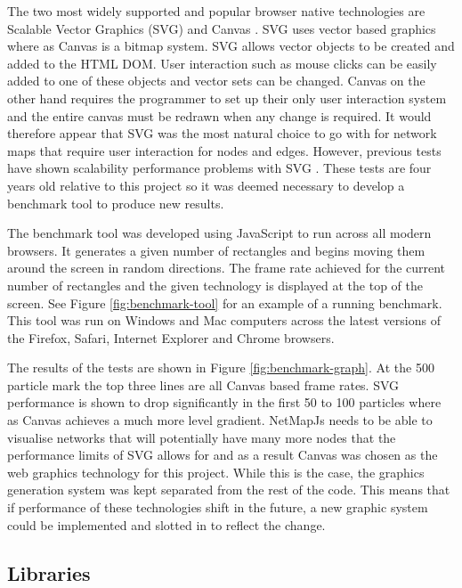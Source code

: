 \documentclass[11pt, a4paper]{article}
\begin{document}
The two most widely supported and popular browser native technologies are
Scalable Vector Graphics (SVG) \cite{Ferraiolo_2003} and Canvas
\cite{Canvas_website}. SVG uses vector based graphics where as Canvas is a
bitmap system. SVG allows vector objects to be created and added to the HTML
DOM. User interaction such as mouse clicks can be easily added to one of these
objects and vector sets can be changed. Canvas on the other hand requires the
programmer to set up their only user interaction system and the entire canvas
must be redrawn when any change is required. It would therefore appear that
SVG was the most natural choice to go with for network maps that require user
interaction for nodes and edges.  However, previous tests have shown scalability
performance problems with SVG \cite{Johnson_2008}. These tests are four years
old relative to this project so it was deemed necessary to develop a benchmark
tool to produce new results.

The benchmark tool was developed using JavaScript to run across all modern
browsers. It generates a given number of rectangles and begins moving them
around the screen in random directions. The frame rate achieved for the current
number of rectangles and the given technology is displayed at the top of the
screen. See Figure \ref{fig:benchmark-tool} for an example of a running
benchmark. This tool was run on Windows and Mac computers across the latest
versions of the Firefox, Safari, Internet Explorer and Chrome browsers. 

The results of the tests are shown in Figure \ref{fig:benchmark-graph}. At the
500 particle mark the top three lines are all Canvas based frame rates. SVG
performance is shown to drop significantly in the first 50 to 100 particles
where as Canvas achieves a much more level gradient. NetMapJs needs to be able
to visualise networks that will potentially have many more nodes that the
performance limits of SVG allows for and as a result Canvas was chosen as the
web graphics technology for this project. While this is the case, the graphics
generation system was kept separated from the rest of the code. This means that
if performance of these technologies shift in the future, a new graphic system
could be implemented and slotted in to reflect the change.


\subsection{Libraries}
\label{sec:libraries}
\end{document}

